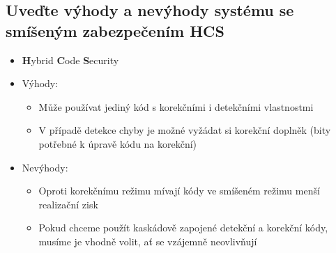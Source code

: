 \subsection{Uveďte výhody a nevýhody systému se smíšeným zabezpečením HCS}
\begin{itemize}
    \item \textbf{H}ybrid \textbf{C}ode \textbf{S}ecurity
    \item Výhody:
    \begin{itemize}
        \item Může používat jediný kód s korekčními i detekčními vlastnostmi
        \item V případě detekce chyby je možné vyžádat si korekční doplněk (bity potřebné k úpravě kódu na korekční)
    \end{itemize}
    \item Nevýhody:
    \begin{itemize}
        \item Oproti korekčnímu režimu mívají kódy ve smíšeném režimu menší realizační zisk
        \item Pokud chceme použít kaskádově zapojené detekční a korekční kódy, musíme je vhodně volit, ať se vzájemně
        neovlivňují
    \end{itemize}
\end{itemize}